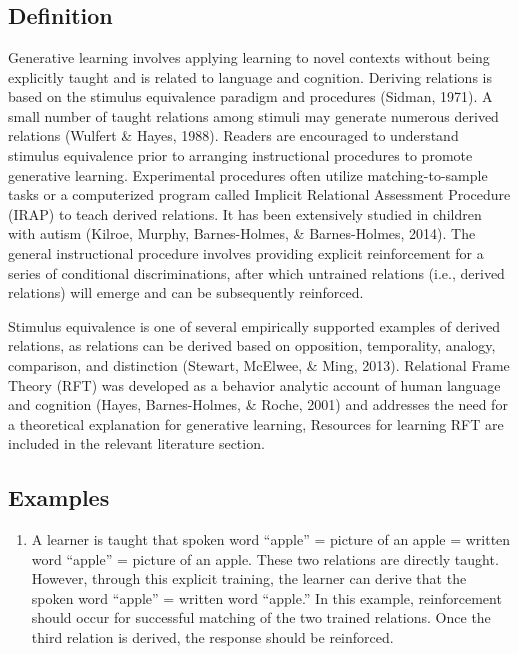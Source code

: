 \section[\fourjFourteen{}]{\fourjFourteen{}%
              }
\subsection{Definition}
Generative learning involves applying learning to novel contexts without being explicitly taught and is related to language and cognition. Deriving relations is based on the stimulus equivalence paradigm and procedures (Sidman, 1971). A small number of taught relations among stimuli may generate numerous derived relations (Wulfert \& Hayes, 1988). Readers are encouraged to understand stimulus equivalence prior to arranging instructional procedures to promote generative learning. Experimental procedures often utilize matching-to-sample tasks or a computerized program called Implicit Relational Assessment Procedure (IRAP) to teach derived relations. It has been extensively studied in children with autism (Kilroe, Murphy, Barnes-Holmes, \& Barnes-Holmes, 2014). The general instructional procedure involves providing explicit reinforcement for a series of conditional discriminations, after which untrained relations (i.e., derived relations) will emerge and can be subsequently reinforced. 

Stimulus equivalence is one of several empirically supported examples of derived relations, as relations can be derived based on opposition, temporality, analogy, comparison, and distinction (Stewart, McElwee, \& Ming, 2013). Relational Frame Theory (RFT) was developed as a behavior analytic account of human language and cognition (Hayes, Barnes-Holmes, \& Roche, 2001) and addresses the need for a theoretical explanation for generative learning, Resources for learning RFT are included in the relevant literature section.  

\subsection{Examples}
\begin{enumerate}
\item  A learner is taught that spoken word ``apple'' = picture of an apple = written word ``apple'' = picture of an apple. These two relations are directly taught. However, through this explicit training, the learner can derive that the spoken word ``apple'' = written word ``apple.'' In this example, reinforcement should occur for successful matching of the two trained relations.  Once the third relation is derived, the response should be reinforced. 
\end{enumerate}
%
